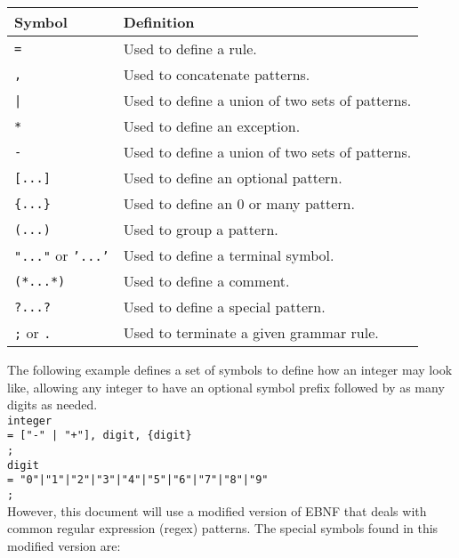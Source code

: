 \begin{center}
    \begin{tabular}{ | l | p{10cm} |}
    \hline
    \textbf{Symbol} & \textbf{Definition} \\ \hline
    \texttt{=} & Used to define a rule. \\ \hline
    \texttt{,} & Used to concatenate patterns. \\ \hline
    \texttt{|} & Used to define a union of two sets of patterns. \\ \hline
    \texttt{*} & Used to define an exception. \\ \hline
    \texttt{-} & Used to define a union of two sets of patterns. \\ \hline
    \texttt{[...]} & Used to define an optional pattern. \\ \hline
    \texttt{\{...\}} & Used to define an 0 or many pattern. \\ \hline
    \texttt{(...)} & Used to group a pattern. \\ \hline
    \texttt{"..."} or \texttt{'...'} & Used to define a terminal symbol. \\ \hline
    \texttt{(*...*)} & Used to define a comment. \\ \hline
    \texttt{?...?} & Used to define a special pattern. \\ \hline
    \texttt{;} or \texttt{.} & Used to terminate a given grammar rule. \\ \hline
    \end{tabular}
\end{center}

The following example defines a set of symbols to define how an integer may look like, allowing any integer to have an optional symbol prefix followed by
as many digits as needed.\\

\texttt{integer\\\tab= ["-" | "+"], digit, \{digit\}\\\tab;}\\
\texttt{digit\\\tab= "0"|"1"|"2"|"3"|"4"|"5"|"6"|"7"|"8"|"9"\\\tab;}\\

However, this document will use a modified version of EBNF that deals with common regular expression (regex) patterns.
The special symbols found in this modified version are:

